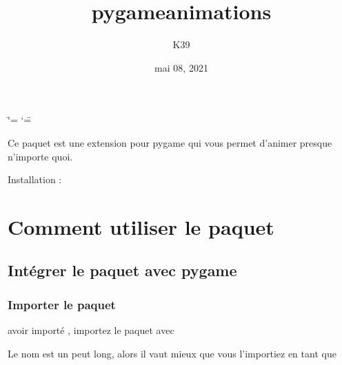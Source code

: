\documentclass[letterpaper,10pt,french]{sphinxmanual}
\title{pygame\sphinxhyphen{}animations}
\date{mai 08, 2021}
\author{K39}
\begin{document}
\ifdefined\shorthandoff
  \ifnum\catcode`\=\string=\active\shorthandoff{=}\fi
  \ifnum\catcode`\"=\active{}\fi
\fi

\pagestyle{empty}
\sphinxmaketitle
\pagestyle{plain}
\sphinxtableofcontents
\pagestyle{normal}
\label{\detokenize{index::doc}}


\sphinxAtStartPar
Ce paquet est une extension pour pygame qui vous permet d’animer presque n’importe quoi.
\begin{description}
\item[{Installation :}] \leavevmode
\sphinxAtStartPar
{}

\end{description}


\chapter{Comment utiliser le paquet}
\label{\detokenize{usage:comment-utiliser-le-paquet}}\label{\detokenize{usage::doc}}

\section{Intégrer le paquet avec pygame}
\label{\detokenize{usage:integrer-le-paquet-avec-pygame}}

\subsection{Importer le paquet}
\label{\detokenize{usage:importer-le-paquet}}
\sphinxAtStartPar
{} avoir importé , importez le paquet avec

\begin{sphinxVerbatim}[commandchars=\\\{\}]
 
\end{sphinxVerbatim}

\sphinxAtStartPar
Le nom est un peut long, alors il vaut mieux que vous l’importiez en tant que

\begin{sphinxVerbatim}[commandchars=\\\{\}]
   
\end{sphinxVerbatim}
\end{document}
